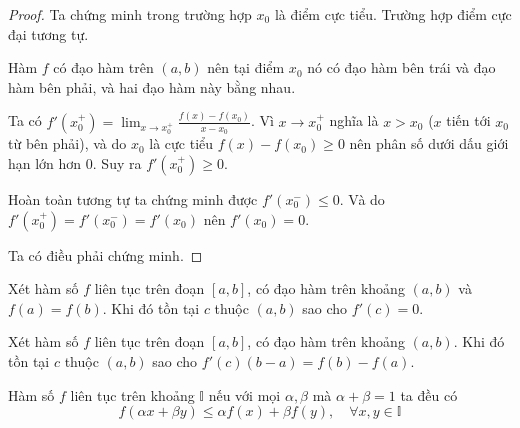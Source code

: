 \documentclass{mynotes}
\newcommand{\II}{\mathbb{I}}
\begin{document}
\begin{proof}
    Ta chứng minh trong trường hợp $x_0$ là điểm cực tiểu. Trường hợp điểm cực đại tương tự.

    Hàm $f$ có đạo hàm trên $(a, b)$ nên tại điểm $x_0$ nó có đạo hàm bên trái và đạo hàm bên phải, và hai đạo hàm này bằng nhau.

    Ta có $\displaystyle{f'(x_0^+) = \lim_{x \to x_0^+} \frac{f(x) - f(x_0)}{x - x_0}}$. Vì $x \to x_0^+$ nghĩa là $x > x_0$ ($x$ tiến tới $x_0$ từ bên phải), và do $x_0$ là cực tiểu $f(x) - f(x_0) \geqslant 0$ nên phân số dưới dấu giới hạn lớn hơn 0. Suy ra $f'(x_0^+) \geqslant 0$.

    Hoàn toàn tương tự ta chứng minh được $f'(x_0^-) \leqslant 0$. Và do $f'(x_0^+) = f'(x_0^-) = f'(x_0)$ nên $f'(x_0) = 0$.

    Ta có điều phải chứng minh.
\end{proof}

\begin{theorem}
    Xét hàm số $f$ liên tục trên đoạn $[a, b]$, có đạo hàm trên khoảng $(a, b)$ và $f(a) = f(b)$. Khi đó tồn tại $c$ thuộc $(a, b)$ sao cho $f'(c) = 0$.
\end{theorem}

\begin{theorem}
    Xét hàm số $f$ liên tục trên đoạn $[a, b]$, có đạo hàm trên khoảng $(a, b)$. Khi đó tồn tại $c$ thuộc $(a, b)$ sao cho $f'(c) (b - a) = f(b) - f(a)$.
\end{theorem}

\begin{definition}
    Hàm số $f$ liên tục trên khoảng $\II$ nếu với mọi $\alpha, \beta$ mà $\alpha + \beta = 1$ ta đều có 
    \begin{equation}
        f(\alpha x + \beta y) \leqslant \alpha f(x) + \beta f(y), \quad \forall x, y \in \II
    \end{equation}
\end{definition}













\printbibliography[title={Tài liệu tham khảo}]
\end{document}
